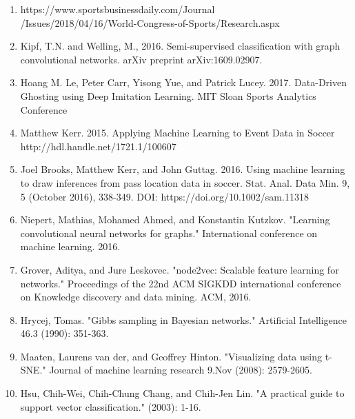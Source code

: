 \begin{enumerate}

\item https://www.sportsbusinessdaily.com/Journal\\
/Issues/2018/04/16/World-Congress-of-Sports/Research.aspx 

\item Kipf, T.N. and Welling, M., 2016. Semi-supervised classification with graph convolutional networks. arXiv preprint         arXiv:1609.02907.

\item Hoang M. Le, Peter Carr, Yisong Yue, and Patrick Lucey. 2017. Data-Driven Ghosting using Deep Imitation Learning. MIT Sloan Sports Analytics Conference

\item Matthew Kerr. 2015. Applying Machine Learning to Event Data in Soccer    http://hdl.handle.net/1721.1/100607

\item Joel Brooks, Matthew Kerr, and John Guttag. 2016. Using machine learning to draw inferences from pass location data in soccer. Stat. Anal. Data Min. 9, 5 (October 2016), 338-349. DOI: https://doi.org/10.1002/sam.11318 

\item Niepert, Mathias, Mohamed Ahmed, and Konstantin Kutzkov. "Learning convolutional neural networks for graphs." International conference on machine learning. 2016.

\item Grover, Aditya, and Jure Leskovec. "node2vec: Scalable feature learning for networks." Proceedings of the 22nd ACM SIGKDD international conference on Knowledge discovery and data mining. ACM, 2016.

\item Hrycej, Tomas. "Gibbs sampling in Bayesian networks." Artificial Intelligence 46.3 (1990): 351-363.

\item Maaten, Laurens van der, and Geoffrey Hinton. "Visualizing data using t-SNE." Journal of machine learning research 9.Nov (2008): 2579-2605.

\item Hsu, Chih-Wei, Chih-Chung Chang, and Chih-Jen Lin. "A practical guide to support vector classification." (2003): 1-16.




\end{enumerate}

